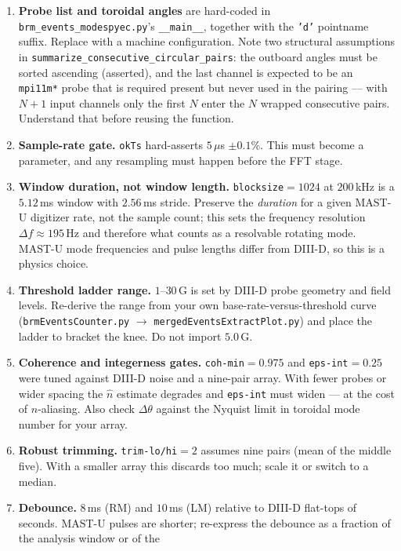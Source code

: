 \documentclass[11pt,a4paper]{article}
\newcommand{\code}[1]{\texttt{\small #1}}
\newcommand{\bk}{\discretionary{}{}{}}   %
\begin{document}
\begin{enumerate}[leftmargin=2em]
\item \textbf{Probe list and toroidal angles} are hard-coded in
\code{brm\_\bk events\_\bk modespyec.py}'s \code{\_\_main\_\_}, together with the \code{'d'} pointname
suffix. Replace with a machine configuration. Note two structural assumptions in
\code{summarize\_consecutive\_circular\_pairs}: the outboard angles must be sorted ascending
(asserted), and the last channel is expected to be an \code{mpi11m*} probe that is required present
but never used in the pairing --- with $N{+}1$ input channels only the first $N$ enter the
$N$ wrapped consecutive pairs. Understand that before reusing the function.
\item \textbf{Sample-rate gate.} \code{okTs} hard-asserts $5\,\mu$s $\pm 0.1\%$. This must become a
parameter, and any resampling must happen before the FFT stage.
\item \textbf{Window duration, not window length.} \code{blocksize}$=1024$ at $200$\,kHz is a
$5.12$\,ms window with $2.56$\,ms stride. Preserve the \emph{duration} for a given MAST-U digitizer
rate, not the sample count; this sets the frequency resolution $\Delta f \approx 195$\,Hz and
therefore what counts as a resolvable rotating mode. MAST-U mode frequencies and pulse lengths
differ from DIII-D, so this is a physics choice.
\item \textbf{Threshold ladder range.} $1$--$30$\,G is set by DIII-D probe geometry and field
levels. Re-derive the range from your own base-rate-versus-threshold curve
(\code{brmEventsCounter.py} $\rightarrow$ \code{mergedEventsExtractPlot.py}) and place the ladder to
bracket the knee. Do not import $5.0$\,G.
\item \textbf{Coherence and integerness gates.} \code{coh-min}$=0.975$ and \code{eps-int}$=0.25$
were tuned against DIII-D noise and a nine-pair array. With fewer probes or wider spacing the
$\hat n$ estimate degrades and \code{eps-int} must widen --- at the cost of $n$-aliasing. Also check
$\Delta\theta$ against the Nyquist limit in toroidal mode number for your array.
\item \textbf{Robust trimming.} \code{trim-lo/hi}$=2$ assumes nine pairs (mean of the middle five).
With a smaller array this discards too much; scale it or switch to a median.
\item \textbf{Debounce.} $8$\,ms (RM) and $10$\,ms (LM) relative to DIII-D flat-tops of seconds.
MAST-U pulses are shorter; re-express the debounce as a fraction of the analysis window or of the

\end{enumerate}
\end{document}
